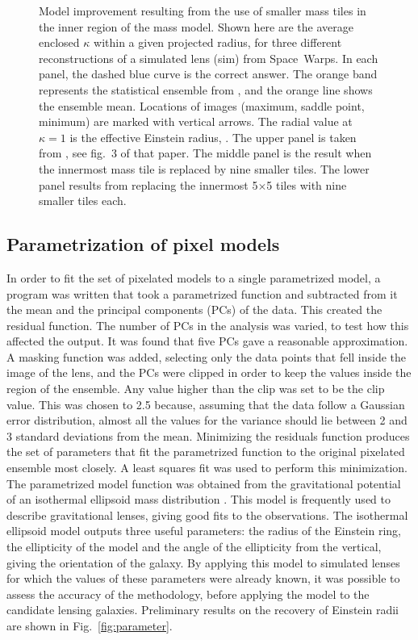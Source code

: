 \begin{figure}
  \caption{Model improvement resulting from the use of smaller mass tiles
    in the inner region of the mass model.  Shown here are the average
    enclosed $\kappa$ within a given projected radius, for three
    different reconstructions of a simulated lens (sim) from
    Space~Warps.  In each panel, the dashed blue curve is the correct
    answer.  The orange band represents the statistical ensemble from
    \SpL, and the orange line shows the ensemble mean.  Locations of
    images (maximum, saddle point, minimum) are marked with vertical
    arrows.  The radial value at $\kappa=1$ is the effective
    Einstein radius, \ER. The upper panel is taken from
    \citet{2015MNRAS.447.2170K}, see fig.~3 of that paper.  The middle
    panel is the result when the innermost mass tile is replaced by nine
    smaller tiles.  The lower panel results from replacing the
    innermost 5$\times$5 tiles with nine smaller tiles each.}
  \label{fig:subsampling}
\end{figure}

\subsection{Parametrization of pixel models} \label{subsec:parameter}

In order to fit the set of pixelated models to a single parametrized
model, a program was written that took a parametrized function and
subtracted from it the mean and the principal components (PCs) of the
data. This created the residual function.  The number of PCs in
the analysis was varied, to test how this affected the
output. It was found that five PCs gave a reasonable approximation. A
masking function was added, selecting only the data points that fell
inside the image of the lens, and the PCs were clipped in order to
keep the values inside the region of the ensemble. Any value higher
than the clip was set to be the clip value. This was chosen to 2.5
because, assuming that the data follow a Gaussian error distribution,
almost all the values for the variance should lie between 2 and 3
standard deviations from the mean. Minimizing the residuals function
produces the set of parameters that fit the parametrized function to
the original pixelated ensemble most closely.  A least squares fit was
used to perform this minimization.  The parametrized model function
was obtained from the gravitational potential of an isothermal
ellipsoid mass distribution \citep{2001astro.ph..2341K}.  This model
is frequently used to describe gravitational lenses, giving good fits
to the observations.  The isothermal ellipsoid model outputs three
useful parameters: the radius of the Einstein ring, the ellipticity of
the model and the angle of the ellipticity from the vertical, giving
the orientation of the galaxy.  By applying this model to simulated
lenses for which the values of these parameters were already known, it
was possible to assess the accuracy of the methodology, before
applying the model to the candidate lensing galaxies.  Preliminary
results on the recovery of Einstein radii are shown in
Fig.~\ref{fig:parameter}.

